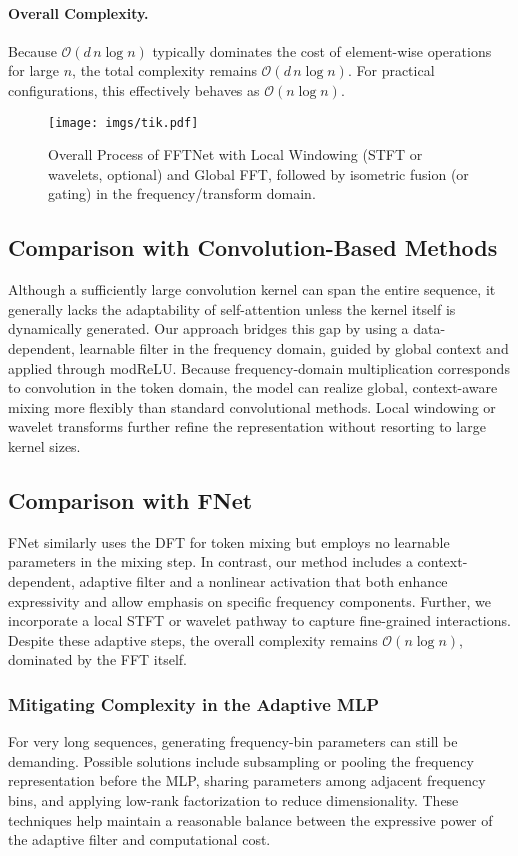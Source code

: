 \paragraph{Overall Complexity.}
Because \(\mathcal{O}(d\,n \log n)\) typically dominates the cost of element-wise operations for large \(n\), the total complexity remains \(\mathcal{O}(d\,n \log n)\). For practical configurations, this effectively behaves as \(\mathcal{O}(n \log n)\).

\begin{figure}
    \centering
    \texttt{[image: imgs/tik.pdf]}
    \caption{Overall Process of FFTNet with Local Windowing (STFT or wavelets, optional) and Global FFT, followed by isometric fusion (or gating) in the frequency/transform domain.}
    \label{fig:fft}
\end{figure}

\subsection{Comparison with Convolution-Based Methods}
Although a sufficiently large convolution kernel can span the entire sequence, it generally lacks the adaptability of self-attention unless the kernel itself is dynamically generated. Our approach bridges this gap by using a data-dependent, learnable filter in the frequency domain, guided by global context and applied through modReLU. Because frequency-domain multiplication corresponds to convolution in the token domain, the model can realize global, context-aware mixing more flexibly than standard convolutional methods. Local windowing or wavelet transforms further refine the representation without resorting to large kernel sizes.

\subsection{Comparison with FNet}
FNet \cite{leethorp2022fnetmixingtokensfourier} similarly uses the DFT for token mixing but employs no learnable parameters in the mixing step. In contrast, our method includes a context-dependent, adaptive filter and a nonlinear activation that both enhance expressivity and allow emphasis on specific frequency components. Further, we incorporate a local STFT or wavelet pathway to capture fine-grained interactions. Despite these adaptive steps, the overall complexity remains \(\mathcal{O}(n \log n)\), dominated by the FFT itself.

\subsubsection{Mitigating Complexity in the Adaptive MLP}
For very long sequences, generating frequency-bin parameters can still be demanding. Possible solutions include  subsampling or pooling the frequency representation before the MLP,  sharing parameters among adjacent frequency bins, and  applying low-rank factorization to reduce dimensionality. These techniques help maintain a reasonable balance between the expressive power of the adaptive filter and computational cost.

